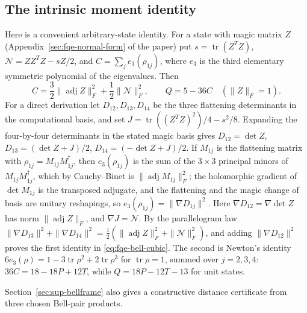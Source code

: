 \subsection{The intrinsic moment identity}
\label{sec:fqe-bell-extraction}

Here is a convenient arbitrary-state identity. For a state with magic matrix $Z$ (Appendix~\ref{sec:fqe-normal-form} of the paper) put $s=\operatorname{tr}(Z^TZ)$,
$\mathcal N=ZZ^TZ-sZ/2$, and $C=\sum_j e_3(\rho_{1j})$, where $e_3$ is the third elementary symmetric
polynomial of the eigenvalues. Then
\begin{equation}\label{eq:fqe-bell-cubic}
 C=\frac32\|\operatorname{adj}Z\|_F^2+\frac12\|\mathcal N\|_F^2,
 \qquad Q=5-36C\quad(\|Z\|_F=1).
\end{equation}
For a direct derivation let $D_{12},D_{13},D_{14}$ be the three flattening determinants
in the computational basis, and set
$J=\operatorname{tr}((Z^TZ)^2)/4-s^2/8$. Expanding the four-by-four
determinants in the stated magic basis gives
$D_{12}=\det Z$, $D_{13}=(\det Z+J)/2$,
$D_{14}=(-\det Z+J)/2$. If $M_{1j}$ is the flattening matrix with $\rho_{1j}=M_{1j}M_{1j}^\dagger$, then
$e_3(\rho_{1j})$ is the sum of the $3\times3$ principal minors of $M_{1j}M_{1j}^\dagger$, which by Cauchy--Binet is
$\|\operatorname{adj}M_{1j}\|_F^2$; the holomorphic gradient of $\det M_{1j}$ is the transposed adjugate, and the flattening
and the magic change of basis are unitary reshapings, so $e_3(\rho_{1j})=\|\nabla D_{1j}\|^2$. Here
$\nabla D_{12}=\nabla\det Z$ has norm $\|\operatorname{adj}Z\|_F$, and $\nabla J=\mathcal N$. By the parallelogram law
$\|\nabla D_{13}\|^2+\|\nabla D_{14}\|^2=\tfrac12(\|\operatorname{adj}Z\|_F^2+\|\mathcal N\|_F^2)$, and adding
$\|\nabla D_{12}\|^2$ proves the first identity in \eqref{eq:fqe-bell-cubic}. The second is Newton's identity
$6e_3(\rho)=1-3\operatorname{tr}\rho^2+2\operatorname{tr}\rho^3$ for $\operatorname{tr}\rho=1$, summed over $j=2,3,4$:
$36C=18-18P+12T$, while $Q=18P-12T-13$ for unit states.

Section~\ref{sec:sup-bellframe} also gives a constructive distance certificate from three chosen Bell-pair products.

